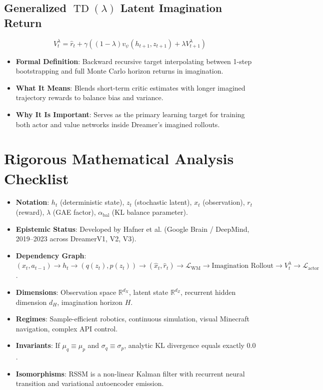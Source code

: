 \documentclass[11pt,a4paper]{article}
\theoremstyle{definition}
\begin{document}
\subsection{Generalized $\operatorname{TD}(\lambda)$ Latent Imagination Return}
{\boldmath
\begin{equation}
V_t^\lambda = \hat{r}_t + \gamma \left( (1 - \lambda) v_\psi(h_{t+1}, z_{t+1}) + \lambda V_{t+1}^\lambda \right)
\end{equation}
}
\begin{itemize}
    \item \textbf{Formal Definition}: Backward recursive target interpolating between 1-step bootstrapping and full Monte Carlo horizon returns in imagination.
    \item \textbf{What It Means}: Blends short-term critic estimates with longer imagined trajectory rewards to balance bias and variance.
    \item \textbf{Why It Is Important}: Serves as the primary learning target for training both actor and value networks inside Dreamer's imagined rollouts.
\end{itemize}

\section{Rigorous Mathematical Analysis Checklist}

\begin{itemize}
    \item \textbf{Notation}: $h_t$ (deterministic state), $z_t$ (stochastic latent), $x_t$ (observation), $r_t$ (reward), $\lambda$ (GAE factor), $\alpha_{\text{bal}}$ (KL balance parameter).
    \item \textbf{Epistemic Status}: Developed by Hafner et al. (Google Brain / DeepMind, 2019--2023 across DreamerV1, V2, V3).
    \item \textbf{Dependency Graph}: $(x_t, a_{t-1}) \to h_t \to (q(z_t), p(z_t)) \to (\hat{x}_t, \hat{r}_t) \to \mathcal{L}_{\text{WM}} \to \text{Imagination Rollout} \to V_t^\lambda \to \mathcal{L}_{\text{actor}}$.
    \item \textbf{Dimensions}: Observation space $\mathbb{R}^{d_X}$, latent state $\mathbb{R}^{d_Z}$, recurrent hidden dimension $d_H$, imagination horizon $H$.
    \item \textbf{Regimes}: Sample-efficient robotics, continuous simulation, visual Minecraft navigation, complex API control.
    \item \textbf{Invariants}: If $\mu_q \equiv \mu_p$ and $\sigma_q \equiv \sigma_p$, analytic KL divergence equals exactly $0.0$.
    \item \textbf{Isomorphisms}: RSSM is a non-linear Kalman filter with recurrent neural transition and variational autoencoder emission.
\end{itemize}
\end{document}
